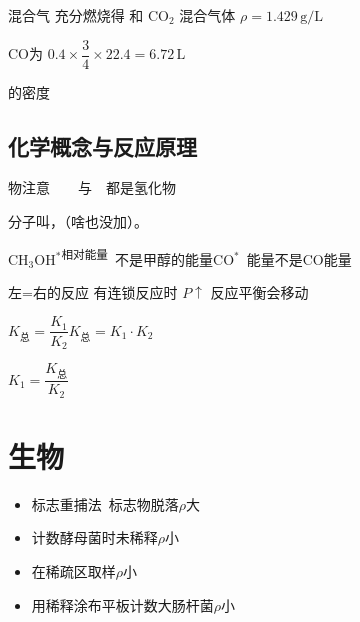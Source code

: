混合气 充分燃烧得  和 $\mathrm{CO_2}$ 混合气体 $\rho=1.429\,\mathrm{g/L}$

$\mathrm{CO}$为 $0.4\times\dfrac{3}{4}\times22.4=6.72\,\mathrm{L}$

的密度 %

\subsection{化学概念与反应原理}
物注意\ \ \ \ 与\ \ 都是氢化物


分子叫，（啥也没加）。

CH$_3$OH$^{*}$\textsuperscript{相对能量}\ 不是甲醇的能量\qquad CO$^{*}$\ 能量不是CO能量

左=右的反应 有连锁反应时 $P\uparrow$ 反应平衡会移动

$K_{\text{总}}=\dfrac{K_1}{K_2}$\qquad $K_{\text{总}}=K_1\cdot K_2$

\hspace{4.2cm}$K_1=\dfrac{K_{\text{总}}}{K_2}$


\section{生物}
\begin{itemize}
\item 标志重捕法\ 标志物脱落\quad $\rho$大
\item 计数酵母菌时未稀释\quad $\rho$小
\item 在稀疏区取样\quad $\rho$小
\item 用稀释涂布平板计数大肠杆菌\quad $\rho$小
\end{itemize}


